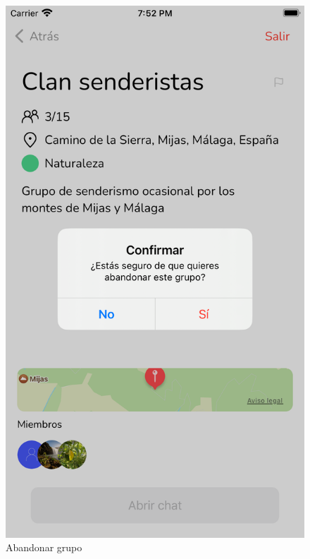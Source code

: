 \begin{appendices}
\begin{figure}[H]
\begin{minipage}{0.3\textwidth}
        \end{minipage}
        \begin{minipage}{0.3\textwidth}
            \centering
            \includegraphics[cframe=black 2pt,width=1\linewidth]{images/manual/confirmarAbandono.png}
        \end{minipage}
        \caption{Abandonar grupo}
        \label{fig:my_label}
\end{figure}


\end{appendices}
